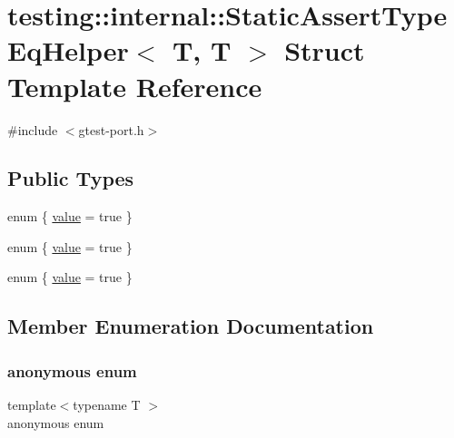 \hypertarget{structtesting_1_1internal_1_1_static_assert_type_eq_helper_3_01_t_00_01_t_01_4}{}\section{testing\+::internal\+::Static\+Assert\+Type\+Eq\+Helper$<$ T, T $>$ Struct Template Reference}
\label{structtesting_1_1internal_1_1_static_assert_type_eq_helper_3_01_t_00_01_t_01_4}


{\ttfamily \#include $<$gtest-\/port.\+h$>$}

\subsection*{Public Types}
\begin{DoxyCompactItemize}
\item 
enum \{ \mbox{\hyperlink{structtesting_1_1internal_1_1_static_assert_type_eq_helper_3_01_t_00_01_t_01_4_a8fe75233c50d03ea2f92b01caa005137a981d533bd53f37d60956f9570465f4e7}{value}} = true
 \}
\item 
enum \{ \mbox{\hyperlink{structtesting_1_1internal_1_1_static_assert_type_eq_helper_3_01_t_00_01_t_01_4_a8fe75233c50d03ea2f92b01caa005137a981d533bd53f37d60956f9570465f4e7}{value}} = true
 \}
\item 
enum \{ \mbox{\hyperlink{structtesting_1_1internal_1_1_static_assert_type_eq_helper_3_01_t_00_01_t_01_4_a8fe75233c50d03ea2f92b01caa005137a981d533bd53f37d60956f9570465f4e7}{value}} = true
 \}
\end{DoxyCompactItemize}


\subsection{Member Enumeration Documentation}
\mbox{\label{structtesting_1_1internal_1_1_static_assert_type_eq_helper_3_01_t_00_01_t_01_4_a8fe75233c50d03ea2f92b01caa005137}} 
\subsubsection{\texorpdfstring{anonymous enum}{anonymous enum}}
{\footnotesize\ttfamily template$<$typename T $>$ \\
anonymous enum}

